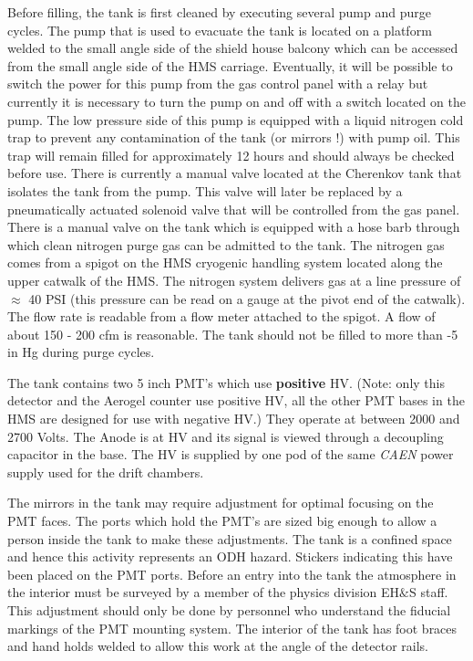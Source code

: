 {Before filling, the tank is first cleaned by executing several pump
and purge cycles. The pump that is used to evacuate the tank is located on a
platform welded to the small angle side of the shield house balcony
which can be accessed from the small angle side of the HMS carriage.
Eventually, it will be possible to switch the power for this pump
from the gas control panel with a relay but currently it
is necessary to turn the pump on and off with a switch located on the pump.
The low pressure side of this pump is equipped with a liquid nitrogen
cold trap to prevent any contamination of the tank (or mirrors !)
with pump oil. This trap will remain filled for approximately
12 hours and should always be checked before use. There is currently
a manual valve located at the Cherenkov tank that isolates the tank from
the pump.  This valve will later be replaced by a pneumatically actuated
solenoid valve that will be controlled from the gas panel.
There is a manual valve on the tank which is equipped with a hose
barb through which clean nitrogen purge gas can be admitted to the tank.
The nitrogen gas comes from a spigot on the HMS cryogenic handling system
located along the upper catwalk of the HMS. The nitrogen system
delivers gas at a line pressure of $\approx$ 40 PSI (this pressure can
be read on a gauge at the pivot end of the catwalk). The flow
rate is readable from a flow meter attached to the spigot. A flow of
about 150 - 200 cfm is reasonable. The tank should not be filled to
more than -5 in Hg during purge cycles.

The tank contains two 5 inch PMT's which use {\bf positive} HV.
(Note: only this detector and the Aerogel counter use positive HV, all the other PMT bases in the HMS are designed for use with
negative HV.) They operate
at between 2000 and 2700 Volts. The Anode is at HV and its signal is
viewed through a decoupling capacitor in the base. The HV is supplied
by one pod of the same {\em CAEN} power supply used for the drift chambers.

The mirrors in the tank may require adjustment for optimal focusing
on the PMT faces. The ports which hold the PMT's are sized big enough to allow
a person inside the tank to make these adjustments. The tank is a confined
space and hence this activity represents an ODH hazard. Stickers indicating
this have been placed on the PMT ports. Before an entry into the tank the
atmosphere in the interior must be surveyed by a member of the physics
division EH$\&$S staff.
This adjustment should only
be done by personnel who understand the fiducial markings of the PMT
mounting system. The interior of the tank has foot braces and hand holds welded
to allow this work at the angle of the detector rails.

}
